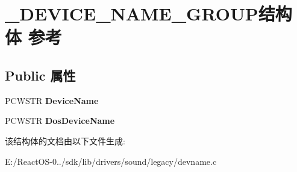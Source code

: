 \hypertarget{struct___d_e_v_i_c_e___n_a_m_e___g_r_o_u_p}{}\section{\+\_\+\+D\+E\+V\+I\+C\+E\+\_\+\+N\+A\+M\+E\+\_\+\+G\+R\+O\+U\+P结构体 参考}
\label{struct___d_e_v_i_c_e___n_a_m_e___g_r_o_u_p}
\subsection*{Public 属性}
\begin{DoxyCompactItemize}
\item 
\mbox{\label{struct___d_e_v_i_c_e___n_a_m_e___g_r_o_u_p_a3d72558ccfdfcb88e14c5752076c4955}} 
P\+C\+W\+S\+TR {\bfseries Device\+Name}
\item 
\mbox{\label{struct___d_e_v_i_c_e___n_a_m_e___g_r_o_u_p_afb91f88b16a52a4bca7133e08abac373}} 
P\+C\+W\+S\+TR {\bfseries Dos\+Device\+Name}
\end{DoxyCompactItemize}


该结构体的文档由以下文件生成\+:\begin{DoxyCompactItemize}
\item 
E\+:/\+React\+O\+S-\/0../sdk/lib/drivers/sound/legacy/devname.\+c\end{DoxyCompactItemize}
